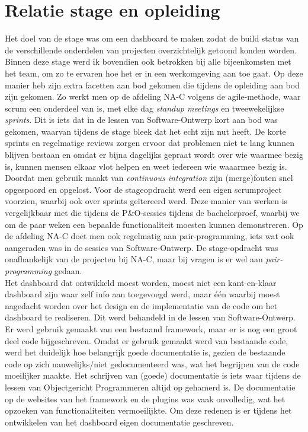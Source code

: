 \documentclass[10pt,a4paper]{article}
\begin{document}
\section{Relatie stage en opleiding}
\label{relatie}
Het doel van de stage was om een dashboard te maken zodat de build status van de verschillende onderdelen van projecten overzichtelijk getoond konden worden. Binnen deze stage werd ik bovendien ook betrokken bij alle bijeenkomsten met het team, om zo te ervaren hoe het er in een werkomgeving aan toe gaat. Op deze manier heb zijn extra facetten aan bod gekomen die tijdens de opleiding aan bod zijn gekomen. Zo werkt men op de afdeling NA-C volgens de agile-methode, waar scrum een onderdeel van is, met elke dag \textit{standup meetings} en tweewekelijkse \textit{sprints}. Dit is iets dat in de lessen van Software-Ontwerp kort aan bod was gekomen, waarvan tijdens de stage bleek dat het echt zijn nut heeft. De korte sprints en regelmatige reviews zorgen ervoor dat problemen niet te lang kunnen blijven bestaan en omdat er bijna dagelijks gepraat wordt over wie waarmee bezig is, kunnen mensen elkaar vlot helpen en weet iedereen wie waaarmee bezig is. Doordat men gebruik maakt van \textit{continuous integration} zijn (merge)fouten snel opgespoord en opgelost. Voor de stageopdracht werd een eigen scrumproject voorzien, waarbij ook over sprints ge\"itereerd werd. Deze manier van werken is vergelijkbaar met die tijdens de P\&O-sessies tijdens de bachelorproef, waarbij we om de paar weken een bepaalde functionaliteit moesten kunnen demonstreren. Op de afdeling NA-C doet men ook regelmatig aan pair-programming, iets wat ook aangeraden was in de sessies van Software-Ontwerp. De stage-opdracht was onafhankelijk van de projecten bij NA-C, maar bij vragen is er wel aan \textit{pair-programming} gedaan.\\
Het dashboard dat ontwikkeld moest worden, moest niet een kant-en-klaar dashboard zijn waar zelf info aan toegevoegd werd, maar \'e\'en waarbij moest nagedacht worden over het design en de implementatie van de code om het dashboard te realiseren. Dit werd behandeld in de lessen van Software-Ontwerp.\\
Er werd gebruik gemaakt van een bestaand framework, maar er is nog een groot deel code bijgeschreven. Omdat er gebruik gemaakt werd van bestaande code, werd het duidelijk hoe belangrijk goede documentatie is, gezien de bestaande code op zich nauwelijks/niet gedocumenteerd was, wat het begrijpen van de code moeilijker maakte. Het schrijven van (goede) documentatie is iets waar tijdens de lessen van Objectgericht Programmeren altijd op gehamerd is. De documentatie op de websites van het framework en de plugins  was vaak onvolledig, wat het opzoeken van functionaliteiten vermoeilijkte. Om deze redenen is er tijdens het ontwikkelen van het dashboard eigen documentatie geschreven.\\
\end{document}
